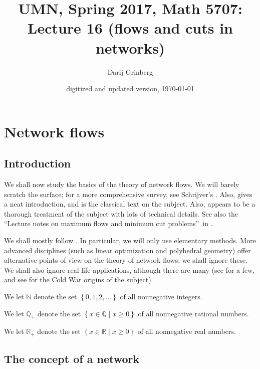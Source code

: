 \documentclass[numbers=enddot,12pt,final,onecolumn,notitlepage]{scrartcl}%
\theoremstyle{definition}
\begin{document}
\title{UMN, Spring 2017, Math 5707: Lecture 16 (flows and cuts in networks)}
\author{Darij Grinberg}
\date{digitized and updated version,
\today
}
\maketitle
\tableofcontents

\section{Network flows}

\subsection{Introduction}

We shall now study the basics of the theory of network flows. We will barely
scratch the surface; for a more comprehensive survey, see Schrijver's
\cite[Chapter 4]{Schrij17}. Also, \cite[\S 8.2]{Martin17} gives a neat
introduction, and \cite{ForFul62} is the classical text on the subject. Also,
\cite{Thalwi08} appears to be a thorough treatment of the subject with lots of
technical details. See also the \textquotedblleft Lecture notes on maximum
flows and minimum cut problems\textquotedblright\ in \cite{Goeman17}.

We shall mostly follow \cite[\S 8.2]{Martin17}. In particular, we will only
use elementary methods. More advanced disciplines (such as linear optimization
and polyhedral geometry) offer alternative points of view on the theory of
network flows; we shall ignore these. We shall also ignore real-life
applications, although there are many (see \cite[Chapter 4]{Schrij17} for a
few, and see \cite[\S 2]{Schrij12} for the Cold War origins of the subject).

We let $\mathbb{N}$ denote the set $\left\{  0,1,2,\ldots\right\}  $ of all
nonnegative integers.

We let $\mathbb{Q}_{+}$ denote the set $\left\{  x\in\mathbb{Q}\mid
x\geq0\right\}  $ of all nonnegative rational numbers.

We let $\mathbb{R}_{+}$ denote the set $\left\{  x\in\mathbb{R}\mid
x\geq0\right\}  $ of all nonnegative real numbers.

\subsection{The concept of a network}
\end{document}
